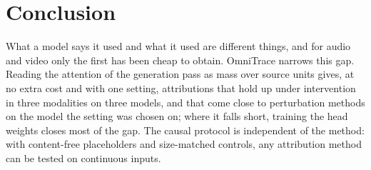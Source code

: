 \section{Conclusion}
What a model says it used and what it used are different things, and for audio and video only the first has been cheap to obtain.
OmniTrace narrows this gap. Reading the attention of the generation pass as mass over source units gives, at no extra cost and with one setting, attributions that hold up under intervention in three modalities on three models, and that come close to perturbation methods on the model the setting was chosen on; where it falls short, training the head weights closes most of the gap.
The causal protocol is independent of the method: with content-free placeholders and size-matched controls, any attribution method can be tested on continuous inputs.
